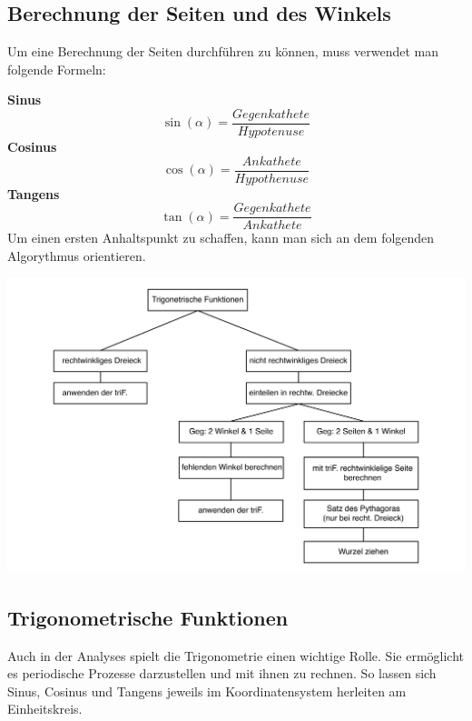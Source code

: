 \subsection{Berechnung der Seiten und des Winkels}\label{sec:Trigonometrie/Berechnung der und des Winkels}
	Um eine Berechnung der Seiten durchführen zu können, muss verwendet man folgende Formeln:
	
\textbf{Sinus} \[ \sin(\alpha)=\frac{Gegenkathete}{Hypotenuse} \]
\textbf{Cosinus} \[ \cos(\alpha)=\frac{Ankathete}{Hypothenuse} \]
\textbf{Tangens} \[ \tan(\alpha)=\frac{Gegenkathete}{Ankathete} \]
Um einen ersten Anhaltspunkt zu schaffen, kann man sich an dem folgenden Algorythmus orientieren. 

\includegraphics[width=15cm]{Media/Algorythmus_Berechnung_eines_Dreiecks}



\pagebreak

\subsection{Trigonometrische Funktionen}\label{sec:Trigonometrie/Trigonometrische Funktionen}
 	Auch in der Analyses spielt die Trigonometrie einen wichtige Rolle. Sie ermöglicht es periodische Prozesse darzustellen und mit ihnen zu rechnen. So lassen sich Sinus, Cosinus und Tangens jeweils im Koordinatensystem herleiten am Einheitskreis.

